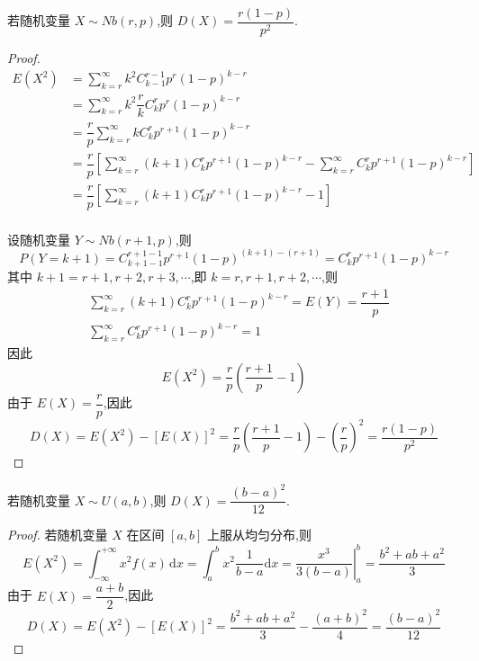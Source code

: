 \begin{conclusion}
    \indent 若随机变量 $X \sim Nb(r,p)$,则 $D(X) = \dfrac{r(1-p)}{p^2}$.
\end{conclusion}

\begin{proof}
    $$
    \begin{aligned}
        E(X^2) &= \sum_{k=r}^{\infty} k^2 C_{k-1}^{r-1} p^r (1-p)^{k-r} \\
        &= \sum_{k=r}^{\infty} k^2 \dfrac{r}{k} C_{k}^{r} p^r (1-p)^{k-r} \\
        &= \dfrac{r}{p} \sum_{k=r}^{\infty} k C_{k}^{r} p^{r+1} (1-p)^{k-r} \\
        &= \dfrac{r}{p} \left[ \sum_{k=r}^{\infty} (k+1) C_{k}^{r} p^{r+1} (1-p)^{k-r} - \sum_{k=r}^{\infty} C_{k}^{r} p^{r+1} (1-p)^{k-r} \right] \\
        &= \dfrac{r}{p} \left[ \sum_{k=r}^{\infty} (k+1) C_{k}^{r} p^{r+1} (1-p)^{k-r} - 1 \right] \\
    \end{aligned}
    $$

    设随机变量 $Y \sim Nb(r+1,p)$,则
    $$
    P(Y=k+1) = C_{k+1-1}^{r+1-1} p^{r+1} (1-p)^{(k+1)-(r+1)} = C_{k}^{r} p^{r+1} (1-p)^{k-r}
    $$
    其中 $k+1 = r+1, r+2, r+3, \cdots$,即 $k = r, r+1, r+2, \cdots$,则
    $$
    \begin{aligned}
        & \sum_{k=r}^{\infty} (k+1) C_{k}^{r} p^{r+1} (1-p)^{k-r} = E(Y) = \dfrac{r+1}{p} \\
        & \sum_{k=r}^{\infty} C_{k}^{r} p^{r+1} (1-p)^{k-r} = 1
    \end{aligned}
    $$
    因此
    $$
    E(X^2) = \dfrac{r}{p} \left( \dfrac{r+1}{p} - 1 \right)
    $$
    由于 $E(X) = \dfrac{r}{p}$,因此
    $$
    D(X) = E(X^2) - [E(X)]^2 = \dfrac{r}{p} \left( \dfrac{r+1}{p} - 1 \right) - \left( \dfrac{r}{p} \right)^2 = \dfrac{r(1-p)}{p^2}
    $$
\end{proof}

\begin{conclusion}
    \indent 若随机变量 $X \sim U(a,b)$,则 $D(X) = \dfrac{(b-a)^2}{12}$.
\end{conclusion}

\begin{proof}
    若随机变量 $X$ 在区间 $[a,b]$ 上服从均匀分布,则
    $$
    E(X^2) = \int_{-\infty}^{+\infty} x^2 f(x) \, \text{d}x = \int_a^b x^2 \dfrac{1}{b-a} \text{d}x = \left. \dfrac{x^3}{3(b-a)} \right|_a^b = \dfrac{b^2 + ab + a^2}{3}
    $$
    由于 $E(X) = \dfrac{a+b}{2}$,因此
    $$
    D(X) = E(X^2) - [E(X)]^2 = \dfrac{b^2 + ab + a^2}{3} - \dfrac{(a+b)^2}{4} = \dfrac{(b-a)^2}{12}
    $$
\end{proof}

